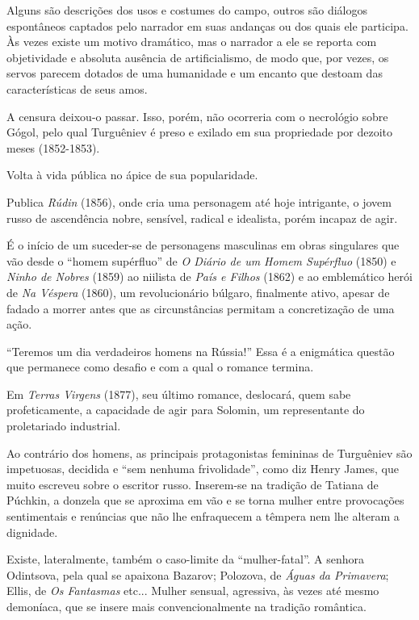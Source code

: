 Alguns são descrições dos usos e costumes do campo, outros são diálogos
espontâneos captados pelo narrador em suas andanças ou dos quais ele
participa. Às vezes existe um motivo dramático, mas o narrador a ele se
reporta com objetividade e absoluta ausência de artificialismo, de modo
que, por vezes, os servos parecem dotados de uma humanidade e um encanto
que destoam das características de seus amos.

A censura deixou-o passar. Isso, porém, não ocorreria com o necrológio
sobre Gógol, pelo qual Turguêniev é preso e exilado em sua propriedade
por dezoito meses (1852-1853).

Volta à vida pública no ápice de sua popularidade.

Publica \emph{Rúdin} (1856), onde cria uma personagem até hoje
intrigante, o jovem russo de ascendência nobre, sensível, radical e
idealista, porém incapaz de agir.

É o início de um suceder-se de personagens masculinas em obras
singulares que vão desde o ``homem supérfluo'' de \emph{O Diário de um
Homem Supérfluo} (1850) e \emph{Ninho de Nobres} (1859) ao niilista de
\emph{País e Filhos} (1862) e ao emblemático herói de \emph{Na Véspera}
(1860), um revolucionário búlgaro, finalmente ativo, apesar de fadado a
morrer antes que as circunstâncias permitam a concretização de uma ação.

``Teremos um dia verdadeiros homens na Rússia!'' Essa é a enigmática
questão que permanece como desafio e com a qual o romance termina.

Em \emph{Terras Virgens} (1877), seu último romance, deslocará, quem
sabe profeticamente, a capacidade de agir para Solomin, um representante
do proletariado industrial.

Ao contrário dos homens, as principais protagonistas femininas de
Turguêniev são impetuosas, decidida e ``sem nenhuma frivolidade'', como
diz Henry James, que muito escreveu sobre o escritor russo. Inserem-se
na tradição de Tatiana de Púchkin, a donzela que se aproxima em vão e se
torna mulher entre provocações sentimentais e renúncias que não lhe
enfraquecem a têmpera nem lhe alteram a dignidade.

Existe, lateralmente, também o caso-limite da ``mulher-fatal''. A
senhora Odintsova, pela qual se apaixona Bazarov; Polozova, de
\emph{Águas da Primavera}; Ellis, de \emph{Os Fantasmas} etc... Mulher
sensual, agressiva, às vezes até mesmo demoníaca, que se insere mais
convencionalmente na tradição romântica.

